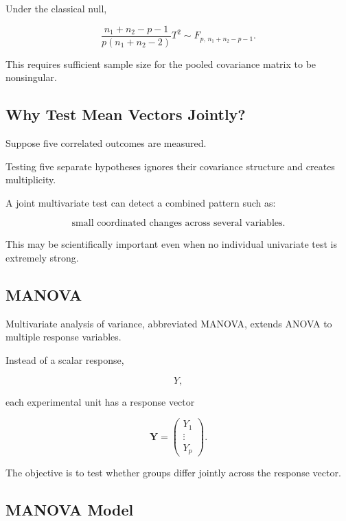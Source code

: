 Under the classical null,

\[
\boxed{
\frac{
n_1+n_2-p-1
}{
p(n_1+n_2-2)
}
T^2
\sim
F_{
p,\,
n_1+n_2-p-1
}.
}
\]

This requires sufficient sample size for the pooled covariance matrix to
be nonsingular.

\subsection{Why Test Mean Vectors Jointly?}
\label{subsec:why-test-mean-vectors-jointly}

Suppose five correlated outcomes are measured.

Testing five separate hypotheses ignores their covariance structure and
creates multiplicity.

A joint multivariate test can detect a combined pattern such as:

\[
\boxed{
\text{small coordinated changes across several variables}.
}
\]

This may be scientifically important even when no individual univariate
test is extremely strong.

\subsection{MANOVA}
\label{subsec:manova}

Multivariate analysis of variance, abbreviated MANOVA, extends ANOVA to
multiple response variables.

Instead of a scalar response,

\[
Y,
\]

each experimental unit has a response vector

\[
\boxed{
\mathbf{Y}
=
\begin{pmatrix}
Y_1\\
\vdots\\
Y_p
\end{pmatrix}.
}
\]

The objective is to test whether groups differ jointly across the
response vector.

\subsection{MANOVA Model}
\label{subsec:manova-model}

